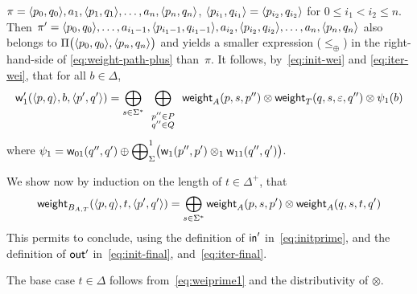 $\pi = \< p_0, q_0>, a_1,\< p_1, q_1>,\ldots, a_n, \< p_n, q_n>$, 
$\< p_{i_1}, q_{i_1}> = \< p_{i_2}, q_{i_2}>$
for $0 \leq i_1 < i_2 \leq n$.
Then 
$\pi' = 
 \< p_0, q_0>, \ldots, 
 a_{i_1-1},\< p_{i_1-1}, q_{i_1-1}>,
 a_{i_2},\< p_{i_2}, q_{i_2}>, \ldots,  a_n, \< p_n, q_n>$ 
also belongs to   $\Pi\bigl(\< p_0, q_0>, \< p_n, q_n>\bigr)$
and yields a smaller expression (\wrt $\leq_\oplus$) 
in the right-hand-side of \eqref{eq:weight-path-plus}
than~$\pi$.
It follows, by~\eqref{eq:init-wei} and \eqref{eq:iter-wei}, that
for all $b \in \Delta$, 
%
\begin{equation}\label{eq:weiprime1}
\wei'_1(\< p, q>, b, \< p', q'>) = 
\displaystyle\bigoplus_{s \in \Sigma^*} 
\displaystyle\bigoplus_{\begin{array}{c}
                        \scriptstyle p'' \in P\\[-1ex]
                        \scriptstyle q'' \in Q
                        \end{array}}
\weight_A(p, s, p'') \otimes \weight_T(q, s, \varepsilon, q'') \otimes \psi_1(b)
\end{equation}
where 
$\psi_1 = \mathsf{w}_{01}(q'', q') \oplus
\displaystyle{\bigoplus}_\Sigma^1 \bigl(\mathsf{w}_1(p'', p') 
 \otimes_1 \mathsf{w}_{11}(q'', q')\bigr)$.
%

\medskip
We show now by induction on the length of $t \in \Delta^+$, that
\[
\weight_{B_{A, T}}(\<p, q>, t, \<p', q'>) = 
 \displaystyle\bigoplus_{s\in \Sigma^*}
 \weight_{A}(p, s, p') \otimes  \weight_{A}(q, s, t, q')
\]
This permits to conclude, using 
the definition of $\mathsf{in}'$ in~\eqref{eq:initprime},
and the definition of $\mathsf{out}'$ 
in~\eqref{eq:init-final}, and~\eqref{eq:iter-final}. 

\noindent
The base case $t \in \Delta$ follows from~\eqref{eq:weiprime1} and 
the distributivity of $\otimes$.

